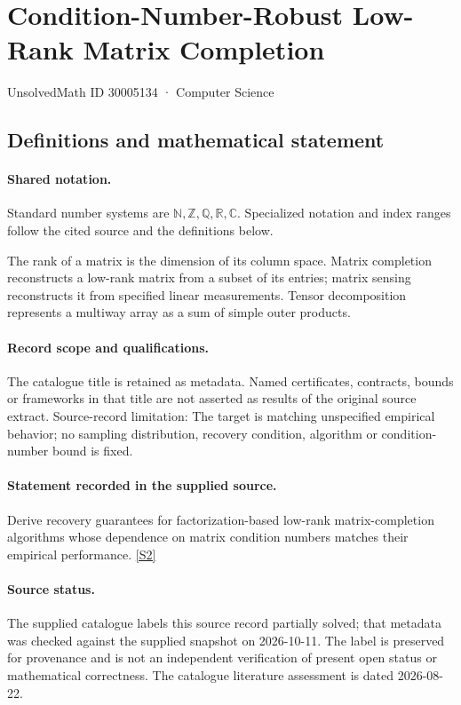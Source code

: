 \documentclass[11pt]{article}
\newcommand{\sref}[2]{\hyperlink{source:#1:#2}{[S#2]}}
\begin{document}
\setcounter{section}{30005133}
\section{Condition-Number-Robust Low-Rank Matrix Completion}\label{30005134}
{\small\sffamily UnsolvedMath ID 30005134 · Computer Science}
\subsection{Definitions and mathematical statement}

\paragraph{Shared notation.}Standard number systems are $\mathbb N,\mathbb Z,\mathbb Q,\mathbb R,\mathbb C$. Specialized notation and index ranges follow the cited source and the definitions below.


The rank of a matrix is the dimension of its column space. Matrix completion reconstructs a low-rank matrix from a subset of its entries; matrix sensing reconstructs it from specified linear measurements. Tensor decomposition represents a multiway array as a sum of simple outer products.
\paragraph{Record scope and qualifications.}
The catalogue title is retained as metadata. Named certificates, contracts, bounds or frameworks in that title are not asserted as results of the original source extract.
Source-record limitation: The target is matching unspecified empirical behavior; no sampling distribution, recovery condition, algorithm or condition-number bound is fixed.
\paragraph{Statement recorded in the supplied source.}
Derive recovery guarantees for factorization-based low-rank matrix-completion algorithms whose dependence on matrix condition numbers matches their empirical performance. \sref{30005134}{2}
\paragraph{Source status.}
The supplied catalogue labels this source record partially solved; that metadata was checked against the supplied snapshot on 2026-10-11. The label is preserved for provenance and is not an independent verification of present open status or mathematical correctness. The catalogue literature assessment is dated 2026-08-22.
\end{document}
